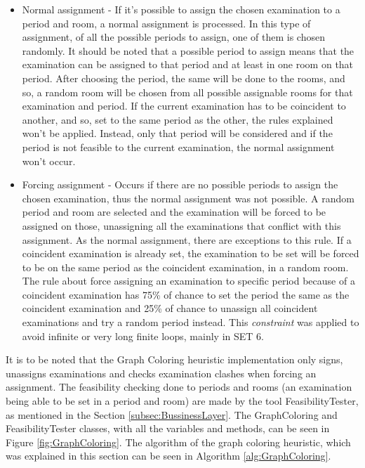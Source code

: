 \begin{itemize}
	\item Normal assignment - If it's possible to assign the chosen examination to a period and room, a normal assignment is processed. In this type of assignment, of all the possible periods to assign, one of them is chosen randomly. It should be noted that a possible period to assign means that the examination can be assigned to that period and at least in one room on that period. After choosing the period, the same will be done to the rooms, and so, a random room will be chosen from all possible assignable rooms for that examination and period. If the current examination has to be coincident to another, and so, set to the same period as the other, the rules explained won't be applied. Instead, only that period will be considered and if the period is not feasible to the current examination, the normal assignment won't occur. \\
	\item Forcing assignment - Occurs if there are no possible periods to assign the chosen examination, thus the normal assignment was not possible. A random period and room are selected and the examination will be forced to be assigned on those, unassigning all the examinations that conflict with this assignment. As the normal assignment, there are exceptions to this rule. If a coincident examination is already set, the examination to be set will be forced to be on the same period as the coincident examination, in a random room. The rule about force assigning an examination to specific period because of a coincident examination has 75\% of chance to set the period the same as the coincident examination and 25\% of chance to unassign all coincident examinations and try a random period instead. This \textit{constraint} was applied to avoid infinite or very long finite loops, mainly in SET 6.
\end{itemize}
It is to be noted that the Graph Coloring heuristic implementation only signs, unassigns examinations and checks examination clashes when forcing an assignment. The feasibility checking done to periods and rooms (an examination being able to be set in a period and room) are made by the tool FeasibilityTester, as mentioned in the Section \ref{subsec:BussinessLayer}. The GraphColoring and FeasibilityTester classes, with all the variables and methods, can be seen in Figure \ref{fig:GraphColoring}. The algorithm of the graph coloring heuristic, which was explained in this section can be seen in Algorithm \ref{alg:GraphColoring}.\\

